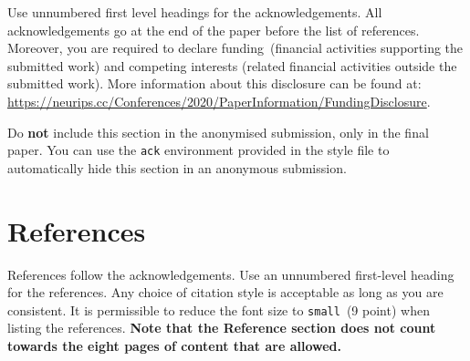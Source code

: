 \documentclass{article}
\begin{document}
\begin{ack}
Use unnumbered first level headings for the acknowledgements. All
acknowledgements go at the end of the paper before the list of
references. Moreover, you are required to declare funding~(financial
activities supporting the submitted work) and competing interests
(related financial activities outside the submitted work).
%
More information about this disclosure can be found at:
\url{https://neurips.cc/Conferences/2020/PaperInformation/FundingDisclosure}.

Do \textbf{not} include this section in the anonymised submission, only
in the final paper. You can use the \texttt{ack} environment provided in
the style file to automatically hide this section in an anonymous
submission.
\end{ack}

\section*{References}

References follow the acknowledgements. Use an unnumbered first-level heading for
the references. Any choice of citation style is acceptable as long as you are
consistent. It is permissible to reduce the font size to \verb+small+~(9 point)
when listing the references.
%
\textbf{Note that the Reference section does not count towards the eight pages of content that are allowed.}
\end{document}
